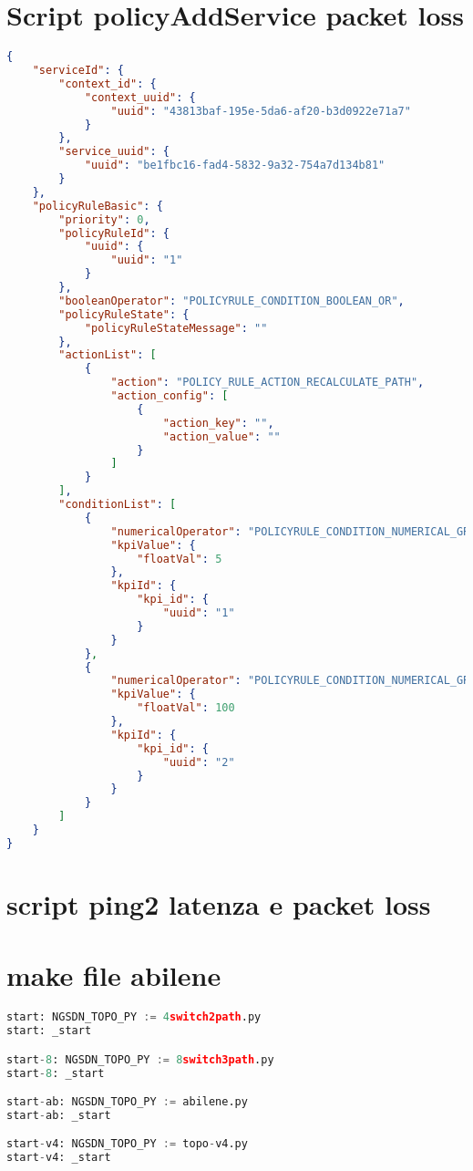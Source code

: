\section{Script policyAddService packet loss}
\begin{lstlisting}[language=json]
{
    "serviceId": {
        "context_id": {
            "context_uuid": {
                "uuid": "43813baf-195e-5da6-af20-b3d0922e71a7"
            }
        },
        "service_uuid": {
            "uuid": "be1fbc16-fad4-5832-9a32-754a7d134b81"
        }
    },
    "policyRuleBasic": {
        "priority": 0,
        "policyRuleId": {
            "uuid": {
                "uuid": "1"
            }
        },
        "booleanOperator": "POLICYRULE_CONDITION_BOOLEAN_OR",
        "policyRuleState": {
            "policyRuleStateMessage": ""
        },
        "actionList": [
            {
                "action": "POLICY_RULE_ACTION_RECALCULATE_PATH",
                "action_config": [
                    {
                        "action_key": "",
                        "action_value": ""
                    }
                ]
            }
        ],
        "conditionList": [
            {
                "numericalOperator": "POLICYRULE_CONDITION_NUMERICAL_GREATER_THAN",
                "kpiValue": {
                    "floatVal": 5
                },
                "kpiId": {
                    "kpi_id": {
                        "uuid": "1"
                    }
                }
            },
            {
                "numericalOperator": "POLICYRULE_CONDITION_NUMERICAL_GREATER_THAN",
                "kpiValue": {
                    "floatVal": 100
                },
                "kpiId": {
                    "kpi_id": {
                        "uuid": "2"
                    }
                }
            }
        ]
    }
}
\end{lstlisting}

\section{script ping2 latenza e packet loss}

\section{make file abilene}
\begin{lstlisting}[language=Python]
start: NGSDN_TOPO_PY := 4switch2path.py
start: _start

start-8: NGSDN_TOPO_PY := 8switch3path.py
start-8: _start

start-ab: NGSDN_TOPO_PY := abilene.py
start-ab: _start

start-v4: NGSDN_TOPO_PY := topo-v4.py
start-v4: _start
\end{lstlisting}

